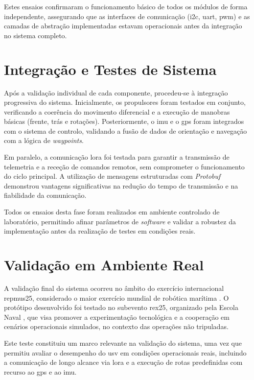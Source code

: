 Estes ensaios confirmaram o funcionamento básico de todos os módulos de forma independente, assegurando que as interfaces de comunicação (\gls{i2c}, \gls{uart}, \gls{pwm}) e as camadas de abstração implementadas estavam operacionais antes da integração no sistema completo.

\section{Integração e Testes de Sistema}

Após a validação individual de cada componente, procedeu-se à integração progressiva do sistema. Inicialmente, os propulsores foram testados em conjunto, verificando a coerência do movimento diferencial e a execução de manobras básicas (frente, trás e rotações). Posteriormente, o \gls{imu} e o \gls{gps} foram integrados com o sistema de controlo, validando a fusão de dados de orientação e navegação com a lógica de \emph{waypoints}.  

Em paralelo, a comunicação \gls{lora} foi testada para garantir a transmissão de telemetria e a receção de comandos remotos, sem comprometer o funcionamento do ciclo principal. A utilização de mensagens estruturadas com \emph{Protobuf} demonstrou vantagens significativas na redução do tempo de transmissão e na fiabilidade da comunicação.  

Todos os ensaios desta fase foram realizados em ambiente controlado de laboratório, permitindo afinar parâmetros de \emph{software} e validar a robustez da implementação antes da realização de testes em condições reais.  

\section{Validação em Ambiente Real}

A validação final do sistema ocorreu no âmbito do exercício internacional \gls{repmus25}, considerado o maior exercício mundial de robótica marítima \cite{iddportugal-repmus, sapo-repmus}. O protótipo desenvolvido foi testado no subevento \gls{rex25}, organizado pela Escola Naval \cite{escolanaval-repmus}, que visa promover a experimentação tecnológica e a cooperação em cenários operacionais simulados, no contexto das operações não tripuladas.  

Este teste constituiu um marco relevante na validação do sistema, uma vez que permitiu avaliar o desempenho do \gls{usv} em condições operacionais reais, incluindo a comunicação de longo alcance via \gls{lora} e a execução de rotas predefinidas com recurso ao \gls{gps} e ao \gls{imu}.  

